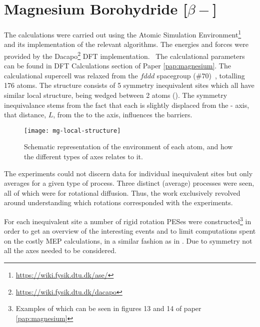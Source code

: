 \section{Magnesium Borohydride [$\beta-$]}
\label{sec:borohydrides-magnesium}

The calculations were carried out using the Atomic Simulation Environment\footnote{\url{https://wiki.fysik.dtu.dk/ase/}}~\cite{ase-2002} and its implementation of the relevant algorithms.
The energies and forces were provided by the Dacapo\footnote{\url{https://wiki.fysik.dtu.dk/dacapo}} DFT implementation.~\cite{dacapo-1999}
The calculational parameters can be found in DFT Calculations section of Paper \ref{pap:magnesium}.
The calculational supercell was relaxed from the $fddd$ spacegroup ($\#70$)~\cite{mgbh42-structure-fddd}, totalling 176 atoms.
The structure consists of 5 symmetry inequivalent  sites which all have similar local structure, being wedged between 2  atoms ().
The symmetry inequivalance stems from the fact that each  is slightly displaced from the - axis, that distance, $L$, from the  to the axis, influences the barriers.

\begin{figure}[htb]
\begin{minipage}{1.0\textwidth}
\begin{center}
    \texttt{[image: mg-local-structure]}
    \parbox{0.85\linewidth}{
\caption{%
Schematic representation of the environment of each  atom, and how the different types of axes relates to it.
}
\label{fig:mg-local-structure}
}
\end{center}
\end{minipage}
\end{figure}

The experiments could not discern data for individual inequivalent sites but only averages for a given type of process.
Three distinct (average) processes were seen, all of which were for rotational diffusion.
Thus, the work exclusively revolved around understanding which rotations corresponded with the experiments.

For each inequivalent site a number of rigid rotation PESes were constructed\footnote{Examples of which can be seen in figures 13 and 14 of paper \ref{pap:magnesium}} in order to get an overview of the interesting events and to limit computations spent on the costly MEP calculations, in a similar fashion as in .
Due to symmetry not all the axes needed to be considered.


